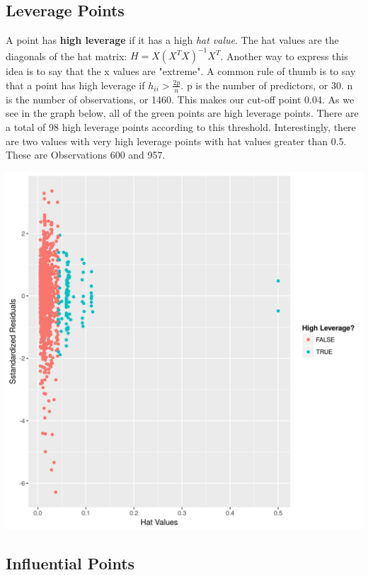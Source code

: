 \documentclass[12pt]{article}
\begin{document}
\begin{flushleft}
\begin{flushleft}
\subsection{Leverage Points}
\begin{flushleft}

A point has \textbf{high leverage} if it has a high \textit{hat value}. The hat values are the diagonals of the hat matrix: $H = X(X^{T}X)^{-1}X^{T}$. Another way to express this idea is to say that the x values are "extreme". A common rule of thumb is to say that a point has high leverage if
$h_{ii} > \frac{2p}{n}$. p is the number of predictors, or 30. n is the number of observations, or 1460. This makes our cut-off point 0.04. As we see in the graph below, all of the green points are high leverage points. There are a total of 98 high leverage points according to this threshold. Interestingly, there are two values with very high leverage points with hat values greater than 0.5. These are Observations 600 and 957.
\end{flushleft}
\centering
    \vspace*{0.5 cm}
    \includegraphics[scale = .40]{leverage.png}\\[1.0 cm]	
    
\begin{flushleft}
\subsection{Influential Points}


\end{flushleft}
\end{flushleft}
\end{flushleft}
\end{document}

